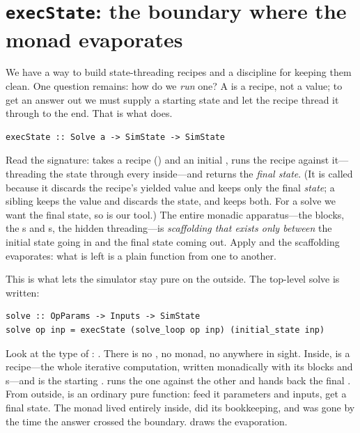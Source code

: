 \section{\texttt{execState}: the boundary where the monad evaporates}
\label{sec:execstate}

We have a way to build state-threading recipes and a discipline for keeping them
clean. One question remains: how do we \emph{run} one? A  is a recipe,
not a value; to get an answer out we must supply a starting state and let the recipe
thread it through to the end. That is what  does.

\begin{lstlisting}[style=l4style]
execState :: Solve a -> SimState -> SimState
\end{lstlisting}

\noindent Read the signature:  takes a recipe () and an
initial , runs the recipe against it---threading the state through
every  inside---and returns the \emph{final state}. (It is called
 because it discards the recipe's yielded value  and keeps only the
final \emph{state}; a sibling  keeps the value and discards the state,
and  keeps both. For a solve we want the final state, so
 is our tool.) The entire monadic apparatus---the  blocks,
the s and s, the hidden threading---is \emph{scaffolding that
exists only between} the initial state going in and the final state coming out.
Apply  and the scaffolding evaporates: what is left is a plain
function from one  to another.

This is what lets the simulator stay pure on the outside. The top-level solve is
written:

\begin{lstlisting}[style=l4style]
solve :: OpParams -> Inputs -> SimState
solve op inp = execState (solve_loop op inp) (initial_state inp)
\end{lstlisting}

\noindent Look at the type of : .
There is no , no monad, no  anywhere in sight. Inside,
 is a  recipe---the whole iterative
computation, written monadically with its  blocks and s---and
 is the starting .  runs the
one against the other and hands back the final . From outside,
 is an ordinary pure function: feed it parameters and inputs, get a final
state. The monad lived entirely inside, did its bookkeeping, and was gone by the time
the answer crossed the boundary.  draws the evaporation.

